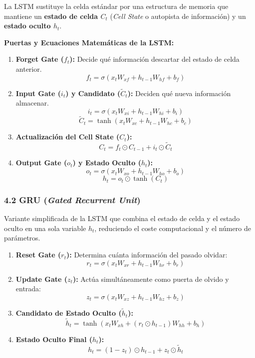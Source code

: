 La LSTM sustituye la celda estándar por una estructura de memoria que mantiene un \textbf{estado de celda $C_t$} (\emph{Cell State} o autopista de información) y un \textbf{estado oculto $h_t$}.

\textbf{Puertas y Ecuaciones Matemáticas de la LSTM:}
\begin{enumerate}
	\item \textbf{Forget Gate ($f_t$):} Decide qué información descartar del estado de celda anterior.
	$$f_t = \sigma\left(x_t W_{xf} + h_{t-1} W_{hf} + b_f\right)$$
	
	\item \textbf{Input Gate ($i_t$) y Candidato ($\tilde{C}_t$):} Deciden qué nueva información almacenar.
	$$i_t = \sigma\left(x_t W_{xi} + h_{t-1} W_{hi} + b_i\right)$$
	$$\tilde{C}_t = \tanh\left(x_t W_{xc} + h_{t-1} W_{hc} + b_c\right)$$
	
	\item \textbf{Actualización del Cell State ($C_t$):}
	$$C_t = f_t \odot C_{t-1} + i_t \odot \tilde{C}_t$$
	
	\item \textbf{Output Gate ($o_t$) y Estado Oculto ($h_t$):}
	$$o_t = \sigma\left(x_t W_{xo} + h_{t-1} W_{ho} + b_o\right)$$
	$$h_t = o_t \odot \tanh(C_t)$$
\end{enumerate}

\subsubsection{4.2 GRU (\emph{Gated Recurrent Unit})}

Variante simplificada de la LSTM que combina el estado de celda y el estado oculto en una sola variable $h_t$, reduciendo el coste computacional y el número de parámetros.

\begin{enumerate}
	\item \textbf{Reset Gate ($r_t$):} Determina cuánta información del pasado olvidar:
	$$r_t = \sigma\left(x_t W_{xr} + h_{t-1} W_{hr} + b_r\right)$$
	
	\item \textbf{Update Gate ($z_t$):} Actúa simultáneamente como puerta de olvido y entrada:
	$$z_t = \sigma\left(x_t W_{xz} + h_{t-1} W_{hz} + b_z\right)$$
	
	\item \textbf{Candidato de Estado Oculto ($\tilde{h}_t$):}
	$$\tilde{h}_t = \tanh\left(x_t W_{xh} + (r_t \odot h_{t-1}) W_{hh} + b_h\right)$$
	
	\item \textbf{Estado Oculto Final ($h_t$):}
	$$h_t = (1 - z_t) \odot h_{t-1} + z_t \odot \tilde{h}_t$$
\end{enumerate}

